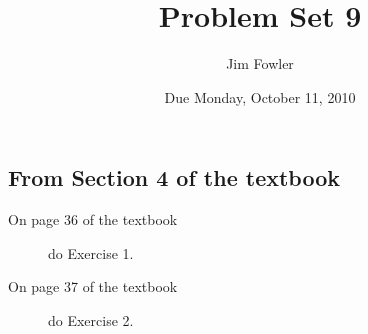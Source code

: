 \documentclass[12pt]{handout}
\author{Jim Fowler}
\title{Problem Set 9}
\date{Due Monday, October 11, 2010}
\begin{document}
\maketitle










\subsection*{From Section 4 of the textbook}



\begin{description}

\item[On page 36 of the textbook] do Exercise 1.

\item[On page 37 of the textbook] do Exercise 2.

\end{description}
\end{document}
